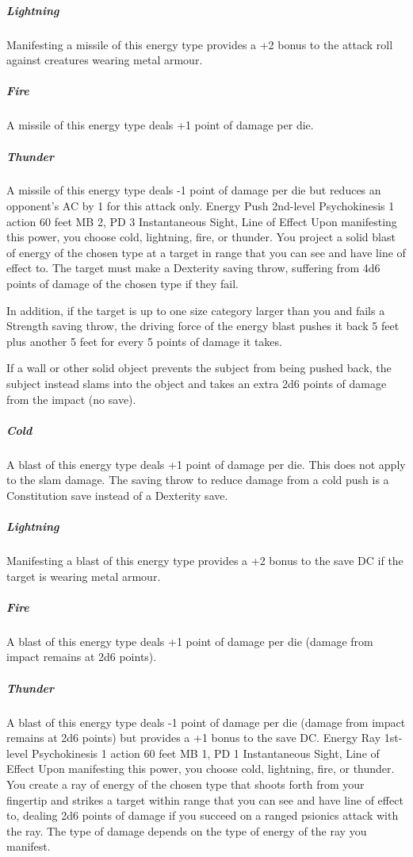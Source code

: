 \subparagraph{Lightning} Manifesting a missile of this energy
type provides a +2 bonus to the attack roll against creatures
wearing metal armour.

\subparagraph{Fire} A missile of this energy type deals +1
point of damage per die.

\subparagraph{Thunder} A missile of this energy type deals
-1 point of damage per die but reduces an opponent's AC by
1 for this attack only.
\DndPowerHeader%
    {Energy Push\label{pwr:energy-push}}
    {2nd-level Psychokinesis}
    {1 action}
    {60 feet}
    {MB 2, PD 3}
    {Instantaneous}
    {Sight, Line of Effect}
Upon manifesting this power, you choose cold,
lightning, fire, or thunder. You project a solid blast of
energy of the chosen type at a target in range that you
can see and have line of effect to. The target must make
a Dexterity saving throw, suffering from 4d6 points of damage
of the chosen type if they fail.

In addition, if the target is
up to one size category larger than you and fails a Strength
saving throw, the driving force of the energy blast pushes
it back 5 feet plus another 5 feet for every 5 points of
damage it takes.

If a wall or other solid object prevents
the subject from being pushed back, the subject instead
slams into the object and takes an extra 2d6 points of damage
from the impact (no save).

\subparagraph{Cold}
A blast of this energy type
deals +1 point of damage per die.
This does not apply to the slam damage.
The saving throw to reduce damage from a cold push
is a Constitution save instead of a Dexterity save.

\subparagraph{Lightning}
Manifesting a blast of this energy type provides a +2 bonus
to the save DC if the target is wearing metal armour.

\subparagraph{Fire}
A blast of this energy type deals +1
point of damage per die (damage from impact remains at
2d6 points).

\subparagraph{Thunder}
A blast of this energy
type deals -1 point of damage per die
(damage from impact
remains at 2d6 points)
but provides a +1 bonus to the save DC.
\DndPowerHeader%
    {Energy Ray\label{pwr:energy-ray}}
    {1st-level Psychokinesis}
    {1 action}
    {60 feet}
    {MB 1, PD 1}
    {Instantaneous}
    {Sight, Line of Effect}
Upon manifesting this power,
you choose cold, lightning, fire, or thunder.
You create a ray of energy of the chosen type that
shoots forth from your fingertip and strikes a target within range
that you can see and have line of effect to,
dealing 2d6 points of damage if you succeed on a
ranged psionics attack with the ray.
The type of damage depends on
the type of energy of the ray you manifest. 

